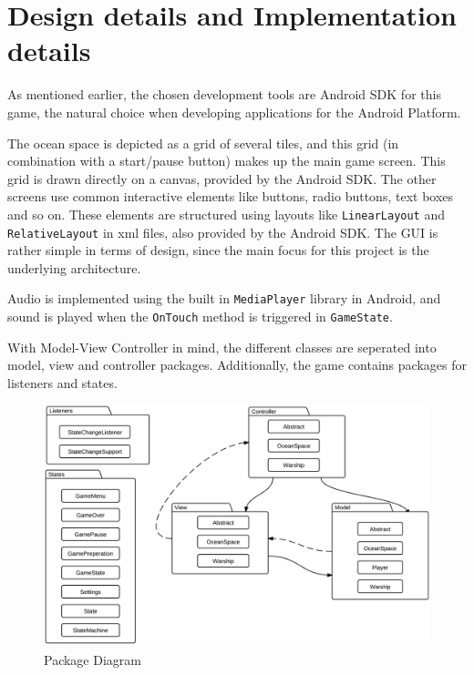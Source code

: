 \chapter{Design details and Implementation details}
\label{cha:design_details}




As mentioned earlier, the chosen development tools are Android SDK for this game, the natural choice when developing applications for the Android Platform. 

The ocean space is depicted as a grid of several tiles, and this grid (in combination with a start/pause button) makes up the main game screen. This grid is drawn directly on a canvas, provided by the Android SDK. The other screens use common interactive elements like buttons, radio buttons, text boxes and so on. These elements are structured using layouts like \texttt{LinearLayout} and \texttt{RelativeLayout} in xml files, also provided by the Android SDK. The GUI is rather simple in terms of design, since the main focus for this project is the underlying architecture.

Audio is implemented using the built in \texttt{MediaPlayer} library in Android, and sound is played when the \texttt{OnTouch} method is triggered in \texttt{GameState}.

With Model-View Controller in mind, the different classes are seperated into model, view and controller packages. Additionally, the game contains packages for listeners and states. 

\begin{figure}[ht]
    \includegraphics[width=\textwidth]{img/PackageDiagram.png}
    \caption{Package Diagram}
    \label{fig:PackageDiagram}
\end{figure}

